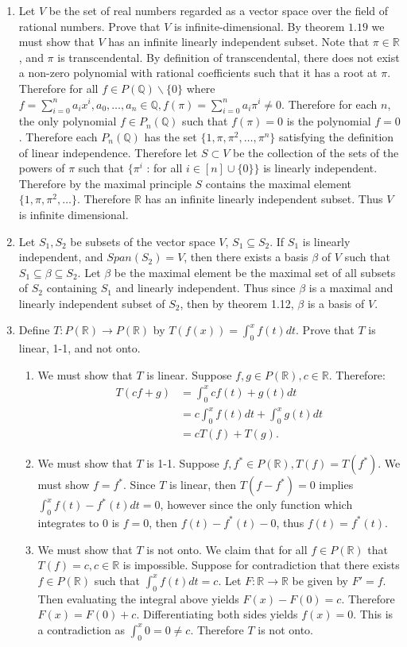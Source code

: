 \documentclass[12pt, letterpaper]{article}
\newcommand{\R}{\mathbb{R}}
\newcommand{\Q}{\mathbb{Q}}
\begin{document}
\begin{enumerate}
		\newpage
		\item Let $V$ be the set of real numbers regarded as a vector space over the field of rational numbers.  Prove that $V$ is infinite-dimensional.  By theorem $1.19$ we must show that $V$ has an infinite linearly independent subset.  Note that $\pi \in \R$, and $\pi$ is transcendental.  By definition of transcendental, there does not exist a non-zero polynomial with rational coefficients such that it has a root at $\pi$.  Therefore for all $f \in P(\Q) \backslash{\{0\}}$ where $f = \sum_{i=0}^n a_i x^i, a_0,\ldots,a_n \in \Q, f(\pi) = \sum_{i=0}^n a_i \pi^i \neq 0$.  Therefore for each $n$, the only polynomial $f \in P_n(\Q)$ such that $f(\pi) = 0$ is the polynomial $f=0$.  Therefore each $P_n(\Q)$ has the set $\{1,\pi, \pi^2,\ldots, \pi^n\}$ satisfying the definition of linear independence.  Therefore let $S \subset V$ be the collection of the sets of the powers of $\pi$ such that $\{\pi^i$ : for all $i \in [n]\cup \{0\}\}$ is linearly independent.  Therefore by the maximal principle $S$ contains the maximal element $\{1,\pi, \pi^2,\ldots\}$.  Therefore $\R$ has an infinite linearly independent subset.  Thus $V$ is infinite dimensional.
		\newpage
		\item Let $S_1, S_2$ be subsets of the vector space $V$, $S_1 \subseteq S_2$.  If $S_1$ is linearly independent, and $Span(S_2) = V$, then there exists a basis $\beta$ of $V$ such that $S_1 \subseteq \beta \subseteq S_2$. 
		Let $\beta$ be the maximal element be the maximal set of all subsets of $S_2$ containing $S_1$ and linearly independent.  Thus since $\beta$ is a maximal and linearly independent subset of $S_2$, then by theorem 1.12, $\beta$ is a basis of $V$.  
		\newpage   
		\item Define $T: P(\R) \to P(\R)$ by $T(f(x)) = \int_0^x f(t) dt.$  Prove that $T$ is linear, 1-1, and not onto.
		\begin{enumerate}
			\item We must show that $T$ is linear.  Suppose $f,g \in P(\R), c \in \R$.  Therefore:
			\begin{align*}
				T(cf + g) &= \int_0^x cf(t) + g(t) dt\\
				&= c\int_0^x f(t) dt + \int_0^x g(t) dt\\
				&= cT(f) + T(g).
			\end{align*}
			\item We must show that $T$ is 1-1.  Suppose $f,f^* \in P(\R), T(f) = T(f^*)$.  We must show $f = f^*$.   
			Since $T$ is linear, then $T(f - f^*) = 0$ implies $\int_0^x f(t) - f^*(t) dt = 0$, however since the only function which integrates to $0$ is $f=0$, then $f(t) - f^*(t) - 0$, thus $f(t)= f^*(t)$.
			\item We must show that $T$ is not onto.  We claim that for all $f \in P(\R)$ that $T(f) = c, c \in \R$ is impossible.  Suppose for contradiction that there exists $f \in P(\R)$  such that $\int_0^x f(t) dt = c.$  Let $F : \R \to \R$ be given by $F' = f$.  Then evaluating the integral above yields $F(x) - F(0) = c$.  Therefore $F(x) = F(0) + c$.  Differentiating both sides yields $f(x) = 0$.  This is a contradiction as $\int_0^x 0 = 0 \neq c$.  Therefore $T$ is not onto.
		\end{enumerate}
	\end{enumerate}
\end{document}
